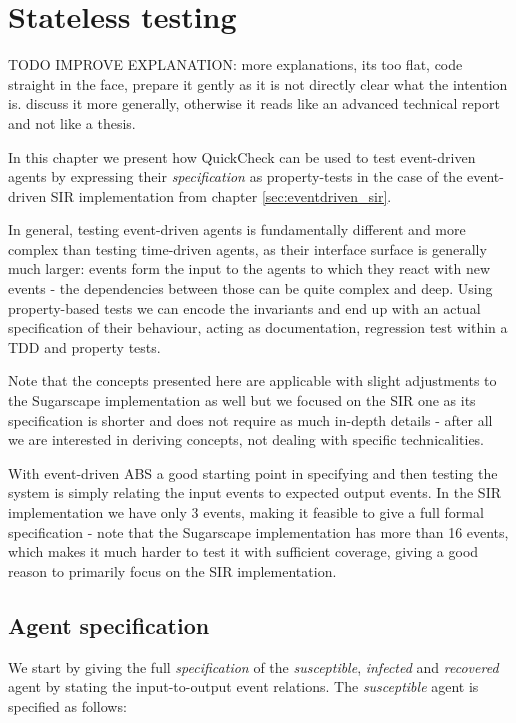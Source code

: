 \chapter{Stateless testing}

TODO IMPROVE EXPLANATION: more explanations, its too flat, code straight in the face, prepare it gently as it is not directly clear what the intention is. discuss it more generally, otherwise it reads like an advanced technical report and not like a thesis.

In this chapter we present how QuickCheck can be used to test event-driven agents by expressing their \textit{specification} as property-tests in the case of the event-driven SIR implementation from chapter \ref{sec:eventdriven_sir}.

In general, testing event-driven agents is fundamentally different and more complex than testing time-driven agents, as their interface surface is generally much larger: events form the input to the agents to which they react with new events - the dependencies between those can be quite complex and deep. Using property-based tests we can encode the invariants and end up with an actual specification of their behaviour, acting as documentation, regression test within a TDD and property tests.

Note that the concepts presented here are applicable with slight adjustments to the Sugarscape implementation as well but we focused on the SIR one as its specification is shorter and does not require as much in-depth details - after all we are interested in deriving concepts, not dealing with specific technicalities.

With event-driven ABS a good starting point in specifying and then testing the system is simply relating the input events to expected output events. In the SIR implementation we have only 3 events, making it feasible to give a full formal specification - note that the Sugarscape implementation has more than 16 events, which makes it much harder to test it with sufficient coverage, giving a good reason to primarily focus on the SIR implementation. 

\section{Agent specification}
We start by giving the full \textit{specification} of the \textit{susceptible}, \textit{infected} and \textit{recovered} agent by stating the input-to-output event relations. The \textit{susceptible} agent is specified as follows:

